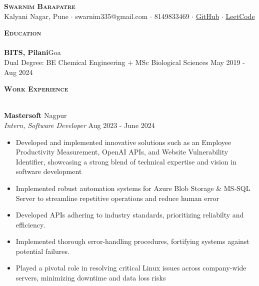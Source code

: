 \documentclass[a4paper]{article}
\newcommand{\lineunder} {
\vspace*{-8pt} \\
\hspace*{-18pt} \hrulefill \\
}
\newcommand{\header}[1]{%
{\hspace*{-18pt}\vspace*{6pt} \textsc{\textbf{\Large{#1}}}}%
\vspace*{-6pt} \lineunder
}
\begin{document}
\vspace*{-40pt}

\vspace*{-10pt}
\begin{center}
{\Huge \scshape \textbf {Swarnim Barapatre}}\\
Kalyani Nagar, Pune $\cdot$ swarnim335@gmail.com $\cdot$ 8149833469 $\cdot$ \href{https://github.com/swarnimcodes/}{GitHub} $\cdot$ \href{https://leetcode.com/u/swarnimcodes/}{LeetCode} \\
\end{center}

\header{Education}

{\textbf{BITS, Pilani}}\hfill Goa\\
Dual Degree: BE Chemical Engineering + MSc Biological Sciences \hfill May 2019 - Aug 2024\\

\vspace{4mm}

\header{Work Experience}
\vspace{1mm}

\textbf{Mastersoft} \hfill Nagpur\\
\textit{Intern, Software Developer} \hfill Aug 2023 - June 2024\\
\vspace{-1mm}
\begin{itemize} \itemsep 1pt
\item Developed and implemented innovative solutions such as an Employee Productivity Measurement, OpenAI APIs, and 
Website Vulnerability Identifier, showcasing a strong blend of technical expertise and vision in software development
\item Implemented robust automation systems for Azure Blob Storage \& MS-SQL Server to streamline repetitive operations and reduce human error
\item Developed APIs adhering to industry standards, prioritizing reliabilty and efficiency. 
\item Implemented thorough error-handling procedures, fortifying systems against potential failures.
\item Played a pivotal role in resolving critical Linux issues across company-wide servers, 
minimizing downtime and data loss risks
\end{itemize}
\end{document}
